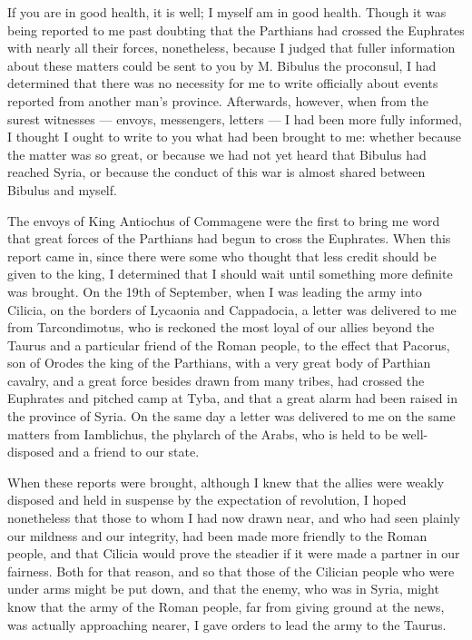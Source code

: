 

 If you are in good health, it is well; I myself am in good health. Though it was being reported to me past doubting that the Parthians had crossed the Euphrates with nearly all their forces, nonetheless, because I judged that fuller information about these matters could be sent to you by M. Bibulus the proconsul, I had determined that there was no necessity for me to write officially about events reported from another man's province. Afterwards, however, when from the surest witnesses --- envoys, messengers, letters --- I had been more fully informed, I thought I ought to write to you what had been brought to me: whether because the matter was so great, or because we had not yet heard that Bibulus had reached Syria, or because the conduct of this war is almost shared between Bibulus and myself.

 The envoys of King Antiochus of Commagene were the first to bring me word that great forces of the Parthians had begun to cross the Euphrates. When this report came in, since there were some who thought that less credit should be given to the king, I determined that I should wait until something more definite was brought. On the 19th of September, when I was leading the army into Cilicia, on the borders of Lycaonia and Cappadocia, a letter was delivered to me from Tarcondimotus, who is reckoned the most loyal of our allies beyond the Taurus and a particular friend of the Roman people, to the effect that Pacorus, son of Orodes the king of the Parthians, with a very great body of Parthian cavalry, and a great force besides drawn from many tribes, had crossed the Euphrates and pitched camp at Tyba, and that a great alarm had been raised in the province of Syria. On the same day a letter was delivered to me on the same matters from Iamblichus, the phylarch of the Arabs, who is held to be well-disposed and a friend to our state.

 When these reports were brought, although I knew that the allies were weakly disposed and held in suspense by the expectation of revolution, I hoped nonetheless that those to whom I had now drawn near, and who had seen plainly our mildness and our integrity, had been made more friendly to the Roman people, and that Cilicia would prove the steadier if it were made a partner in our fairness. Both for that reason, and so that those of the Cilician people who were under arms might be put down, and that the enemy, who was in Syria, might know that the army of the Roman people, far from giving ground at the news, was actually approaching nearer, I gave orders to lead the army to the Taurus.

